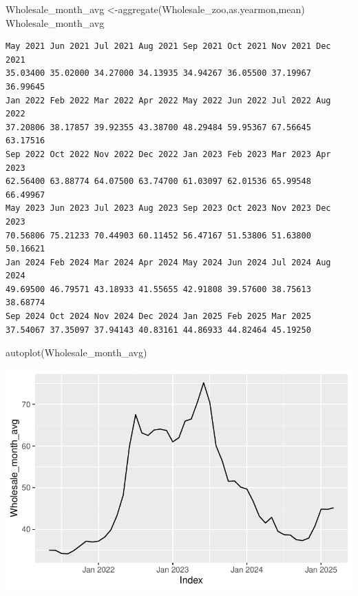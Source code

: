 \documentclass[
  letterpaper,
  DIV=11,
  numbers=noendperiod]{scrartcl}
\newenvironment{Shaded}{\begin{snugshade}}{\end{snugshade}}
\newcommand{\FunctionTok}[1]{\textcolor[rgb]{0.28,0.35,0.67}{#1}}
\newcommand{\NormalTok}[1]{\textcolor[rgb]{0.00,0.23,0.31}{#1}}
\newcommand{\OtherTok}[1]{\textcolor[rgb]{0.00,0.23,0.31}{#1}}
\begin{document}
\begin{Shaded}
\begin{Highlighting}[]
\NormalTok{Wholesale\_month\_avg }\OtherTok{\textless{}{-}}\FunctionTok{aggregate}\NormalTok{(Wholesale\_zoo,as.yearmon,mean)}
\NormalTok{Wholesale\_month\_avg}
\end{Highlighting}
\end{Shaded}

\begin{verbatim}
May 2021 Jun 2021 Jul 2021 Aug 2021 Sep 2021 Oct 2021 Nov 2021 Dec 2021 
35.03400 35.02000 34.27000 34.13935 34.94267 36.05500 37.19967 36.99645 
Jan 2022 Feb 2022 Mar 2022 Apr 2022 May 2022 Jun 2022 Jul 2022 Aug 2022 
37.20806 38.17857 39.92355 43.38700 48.29484 59.95367 67.56645 63.17516 
Sep 2022 Oct 2022 Nov 2022 Dec 2022 Jan 2023 Feb 2023 Mar 2023 Apr 2023 
62.56400 63.88774 64.07500 63.74700 61.03097 62.01536 65.99548 66.49967 
May 2023 Jun 2023 Jul 2023 Aug 2023 Sep 2023 Oct 2023 Nov 2023 Dec 2023 
70.56806 75.21233 70.44903 60.11452 56.47167 51.53806 51.63800 50.16621 
Jan 2024 Feb 2024 Mar 2024 Apr 2024 May 2024 Jun 2024 Jul 2024 Aug 2024 
49.69500 46.79571 43.18933 41.55655 42.91808 39.57600 38.75613 38.68774 
Sep 2024 Oct 2024 Nov 2024 Dec 2024 Jan 2025 Feb 2025 Mar 2025 
37.54067 37.35097 37.94143 40.83161 44.86933 44.82464 45.19250 
\end{verbatim}

\begin{Shaded}
\begin{Highlighting}[]
\FunctionTok{autoplot}\NormalTok{(Wholesale\_month\_avg)}
\end{Highlighting}
\end{Shaded}

\includegraphics{Maize_analysis_files/figure-pdf/unnamed-chunk-16-1.pdf}
\end{document}
